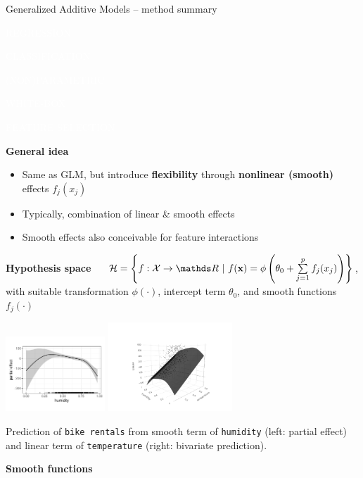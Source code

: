 \documentclass[11pt,compress,t,notes=noshow, xcolor=table]{beamer}
\newcommand{\highlight}[1]{\textcolor{hlcol}{\textbf{#1}}}
\newcommand{\maketag}[2][100]{
  \colorbox{hlcol!#1}{\textcolor{white}{\MakeUppercase{\scriptsize #2}} 
  \vphantom{}}
}
\begin{document}
\begin{frame2}{Generalized Additive Models -- method summary}
\maketag{regression} \maketag{classification} \maketag[50]{(NON)PARAMETRIC}
\maketag[50]{WHITE-BOX} \maketag[50]{Feature selection}
\medskip

\highlight{General idea}
\begin{itemize}
  \item Same as GLM, but introduce \textbf{flexibility} through
  \textbf{nonlinear (smooth)} effects $f_j(x_j)$
  \item Typically, combination of linear \& smooth effects
  \item Smooth effects also conceivable for feature interactions
\end{itemize}
\medskip

\highlight{Hypothesis space} ~~
$\Hspace = \left\{f: \Xspace \to \R ~|~\fx = \phi \left(\theta_0 + \textstyle \sumjp
f_j(x_j) \right) \right\}$,
with suitable transformation $\phi(\cdot)$, intercept term $\theta_0$, and smooth
functions $f_j(\cdot)$

\includegraphics[width=0.28\textwidth]{figure/gam_bike_partial_effect}
\includegraphics[width=0.35\textwidth, trim=0 0 0 80, clip]{figure/gam_bike_pred}

\tiny
Prediction of \texttt{bike rentals} from smooth term of \texttt{humidity}
(left: partial effect) and linear term of \texttt{temperature} (right: bivariate
prediction).
\normalsize

\framebreak

\highlight{Smooth functions}


\end{frame2}
\end{document}
